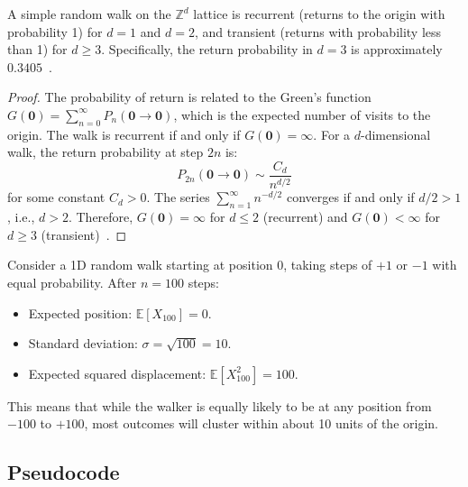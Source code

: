 \begin{theorem}\label{thm:polya_recurrence}
A simple random walk on the $\mathbb{Z}^d$ lattice is recurrent (returns to the origin with probability 1) for $d = 1$ and $d = 2$, and transient (returns with probability less than 1) for $d \ge 3$. Specifically, the return probability in $d = 3$ is approximately $0.3405$~\cite{polya1921}.
\end{theorem}

\begin{proof}
The probability of return is related to the Green's function $G(\mathbf{0}) = \sum_{n=0}^{\infty} P_n(\mathbf{0} \to \mathbf{0})$, which is the expected number of visits to the origin. The walk is recurrent if and only if $G(\mathbf{0}) = \infty$. For a $d$-dimensional walk, the return probability at step $2n$ is:
\[
P_{2n}(\mathbf{0} \to \mathbf{0}) \sim \frac{C_d}{n^{d/2}}
\]
for some constant $C_d > 0$. The series $\sum_{n=1}^{\infty} n^{-d/2}$ converges if and only if $d/2 > 1$, i.e., $d > 2$. Therefore, $G(\mathbf{0}) = \infty$ for $d \le 2$ (recurrent) and $G(\mathbf{0}) < \infty$ for $d \ge 3$ (transient)~\cite{spitzer1976}.
\end{proof}

\begin{example}\label{ex:random_walk_1d}
Consider a 1D random walk starting at position 0, taking steps of $+1$ or $-1$ with equal probability. After $n = 100$ steps:
\begin{itemize}
    \item Expected position: $\mathbb{E}[X_{100}] = 0$.
    \item Standard deviation: $\sigma = \sqrt{100} = 10$.
    \item Expected squared displacement: $\mathbb{E}[X_{100}^2] = 100$.
\end{itemize}
This means that while the walker is equally likely to be at any position from $-100$ to $+100$, most outcomes will cluster within about 10 units of the origin.
\end{example}



\subsection{Pseudocode}

